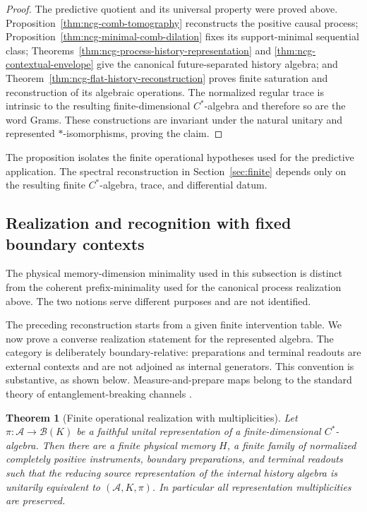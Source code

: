 \documentclass[11pt]{article}
\newtheorem{theorem}{Theorem}[section]
\theoremstyle{definition}
\theoremstyle{remark}
\theoremstyle{definition}
\theoremstyle{remark}
\newcommand{\A}{\mathcal A}
\begin{document}
\begin{proof}
The predictive quotient and its universal property were proved above.
Proposition~\ref{thm:ncg-comb-tomography} reconstructs the positive causal process;
Proposition~\ref{thm:ncg-minimal-comb-dilation} fixes its support-minimal sequential
class; Theorems~\ref{thm:ncg-process-history-representation} and
\ref{thm:ncg-contextual-envelope} give the canonical future-separated history
algebra; and Theorem~\ref{thm:ncg-flat-history-reconstruction} proves finite
saturation and reconstruction of its algebraic operations.  The normalized regular
trace is intrinsic to the resulting finite-dimensional $C^*$-algebra and therefore
so are the word Grams.  These constructions are invariant under the natural
unitary and represented $*$-isomorphisms, proving the claim.
\end{proof}

The proposition isolates the finite operational hypotheses used for the predictive
application.  The spectral reconstruction in Section~\ref{sec:finite} depends only on the resulting
finite $C^*$-algebra, trace, and differential datum.

\subsection{Realization and recognition with fixed boundary contexts}
\label{subsec:operational-recognition-detail}

The physical memory-dimension minimality used in this subsection is distinct from
the coherent prefix-minimality used for the canonical process realization above.
The two notions serve different purposes and are not identified.

The preceding reconstruction starts from a given finite intervention table.  We
now prove a converse realization statement for the represented algebra.  The
category is deliberately boundary-relative: preparations and terminal readouts are
external contexts and are not adjoined as internal generators.  This convention
is substantive, as shown below.  Measure-and-prepare maps belong to the standard
theory of entanglement-breaking channels \cite{HorodeckiShorRuskai2003}.

\begin{theorem}[Finite operational realization with multiplicities]
\label{thm:ncg-operational-realization}
Let $\pi:\A\to\mathcal B(K)$ be a faithful unital representation of a
finite-dimensional $C^*$-algebra.  Then there are a finite physical memory $H$,
a finite family of normalized completely positive instruments, boundary
preparations, and terminal readouts such that the reducing source representation of
the internal history algebra is unitarily equivalent to $(\A,K,\pi)$.  In
particular all representation multiplicities are preserved.
\end{theorem}
\end{document}
